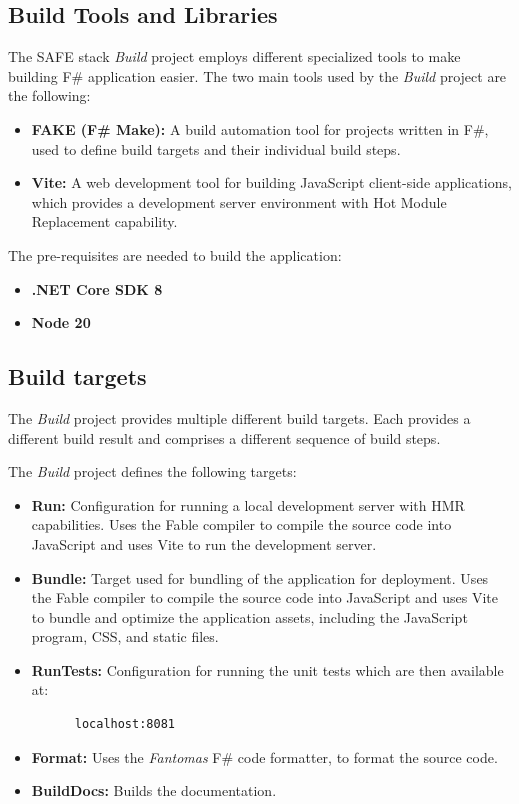 \medskip
\subsection{Build Tools and Libraries}
The SAFE stack \emph{Build} project employs different specialized tools to make building F\# application easier.
The two main tools used by the \emph{Build} project are the following:
\begin{itemize}
	\item \textbf{FAKE (F\# Make):} A build automation tool for projects written in F\#, used to define build targets and their individual build steps.
	\item \textbf{Vite:} A web development tool for building JavaScript client-side applications, which provides a development server environment with Hot Module Replacement capability.
\end{itemize}


\noindent The pre-requisites are needed to build the application:
\begin{itemize}
	\item \textbf{.NET Core SDK 8}
	\item \textbf{Node 20}
\end{itemize}

\medskip
\subsection{Build targets}
The \emph{Build} project provides multiple different build targets.
Each provides a different build result and comprises a different sequence of build steps.

The \emph{Build} project defines the following targets:
\begin{itemize}
	\item \textbf{Run:} Configuration for running a local development server with HMR capabilities.
	      Uses the Fable compiler to compile the source code into JavaScript and uses Vite to run the development server.
	\item \textbf{Bundle:} Target used for bundling of the application for deployment.
	      Uses the Fable compiler to compile the source code into JavaScript and uses Vite to
	      bundle and optimize the application assets, including the JavaScript program, CSS, and static files.
	\item \textbf{RunTests:} Configuration for running the unit tests which are then available at:
	      \begin{lstlisting}
      localhost:8081
    \end{lstlisting}
	\item \textbf{Format:} Uses the \emph{Fantomas} F\# code formatter, to format the source code.
	\item \textbf{BuildDocs:} Builds the documentation.
\end{itemize}

